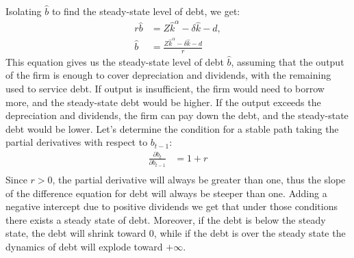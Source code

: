 \documentclass[12pt]{report}
\begin{document}
Isolating \( \widehat{b} \) to find the steady-state level of debt, we get:
\begin{align}
    r \widehat{b} &= Z \widehat{k}^\alpha - \delta \widehat{k} - d, \nonumber\\
    \widehat{b} &= \frac{Z \widehat{k}^\alpha - \delta \widehat{k} - d}{r}
\end{align}
This equation gives us the steady-state level of debt \( \widehat{b} \), assuming that the output of the firm is enough
to cover depreciation and dividends, with the remaining used to service debt. If output is insufficient, the
firm would need to borrow more, and the steady-state debt would be higher. If the output exceeds the depreciation and
dividends, the firm can pay down the debt, and the steady-state debt would be lower. 
Let's determine the condition for a stable path taking the partial derivatives with respect to \(b_{t-1}\):
\begin{align}
    \frac{\partial{b_t}}{\partial b_{t-1}} &= 1+r  \label{eq11} \\
\end{align}
Since \(r >0\), the partial derivative will always be greater than one, thus the slope of the
difference equation for debt will always be steeper than one. Adding a negative intercept due to positive dividends we
get that under those conditions there exists a steady state of debt. Moreover, if the debt is below the steady state, the
debt will shrink toward 0, while if the debt is over the steady state the dynamics of debt will explode toward
\(+\infty\).
\end{document}
